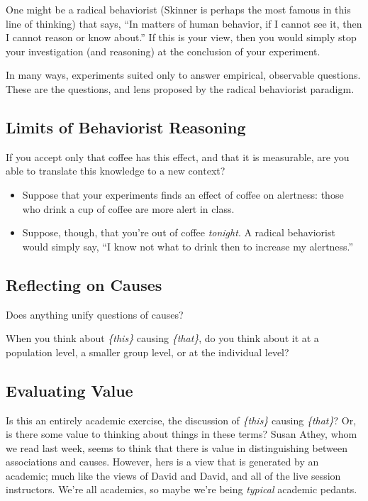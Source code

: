 \documentclass[
]{book}
\providecommand{\tightlist}{%
  \setlength{\itemsep}{0pt}\setlength{\parskip}{0pt}}
\begin{document}
One might be a radical behaviorist (Skinner is perhaps the most famous
in this line of thinking) that says, ``In matters of human behavior, if
I cannot see it, then I cannot reason or know about.'' If this is your
view, then you would simply stop your investigation (and reasoning) at
the conclusion of your experiment.

In many ways, experiments suited only to answer empirical, observable
questions. These are the questions, and lens proposed by the radical
behaviorist paradigm.

\hypertarget{limits-of-behaviorist-reasoning}{%
\subsection{Limits of Behaviorist
Reasoning}\label{limits-of-behaviorist-reasoning}}

If you accept only that coffee has this effect, and that it is
measurable, are you able to translate this knowledge to a new context?

\begin{itemize}
\tightlist
\item
  Suppose that your experiments finds an effect of coffee on alertness:
  those who drink a cup of coffee are more alert in class.
\item
  Suppose, though, that you're out of coffee \emph{tonight}. A radical
  behaviorist would simply say, ``I know not what to drink then to
  increase my alertness.''
\end{itemize}

\hypertarget{reflecting-on-causes}{%
\subsection{Reflecting on Causes}\label{reflecting-on-causes}}

Does anything unify questions of causes?

When you think about \emph{\{this\}} causing \emph{\{that\}}, do you
think about it at a population level, a smaller group level, or at the
individual level?

\hypertarget{evaluating-value}{%
\subsection{Evaluating Value}\label{evaluating-value}}

Is this an entirely academic exercise, the discussion of \emph{\{this\}}
causing \emph{\{that\}}? Or, is there some value to thinking about
things in these terms? Susan Athey, whom we read last week, seems to
think that there is value in distinguishing between associations and
causes. However, hers is a view that is generated by an academic; much
like the views of David and David, and all of the live session
instructors. We're all academics, so maybe we're being \emph{typical}
academic pedants.
\end{document}
